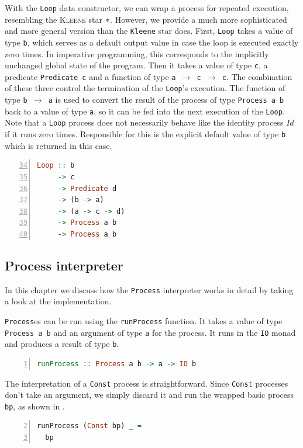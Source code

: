 With the \texttt{Loop} data constructor, we can wrap a process for repeated execution, resembling the \textsc{Kleene} star $*$. However, we provide a much more sophisticated and more general version than the \texttt{Kleene} star does. First, \texttt{Loop} takes a value of type \texttt{b}, which serves as a default output value in case the loop is executed exactly zero times. In imperative programming, this corresponds to the implicitly unchanged global state of the program. Then it takes a value of type \texttt{c}, a predicate \texttt{Predicate c} and a function of type \texttt{a $\to$ c $\to$ c}. The combination of these three control the termination of the \texttt{Loop}'s execution. The function of type \texttt{b $\to$ a} is used to convert the result of the process of type \texttt{Process a b} back to a value of type \texttt{a}, so it can be fed into the next execution of the \texttt{Loop}. Note that a \texttt{Loop} process does not necessarily behave like the identity process $Id$ if it runs zero times. Responsible for this is the explicit default value of type \texttt{b} which is returned in this case.
\begin{lstlisting}[language=Haskell,caption=Signature of the \texttt{Loop} data constructor.,numbers=left,frame=bt,firstnumber=34]
Loop :: b
     -> c
     -> Predicate d
     -> (b -> a)
     -> (a -> c -> d)
     -> Process a b
     -> Process a b
\end{lstlisting}


\subsection{Process interpreter}
In this chapter we discuss how the \texttt{Process} interpreter works in detail by taking a look at the implementation.

\texttt{Process}es can be run using the \texttt{runProcess} function. It takes a value of type \texttt{Process a b} and an argument of type \texttt{a} for the process. It runs in the \texttt{IO} monad and produces a result of type \texttt{b}.
\begin{lstlisting}[language=Haskell,caption=Signature of the process interpreter.,label=lst:local_runprocess_signature,numbers=left,frame=bt]
runProcess :: Process a b -> a -> IO b
\end{lstlisting}

The interpretation of a \texttt{Const} process is straightforward. Since \texttt{Const} processes don't take an argument, we simply discard it and run the wrapped basic process \texttt{bp}, as shown in .
\begin{lstlisting}[language=Haskell,caption=Implementation of the interpreter of \texttt{Const} processes.,label=lst:local_runprocess_const,numbers=left,frame=bt,firstnumber=2]
runProcess (Const bp) _ =
  bp
\end{lstlisting}

